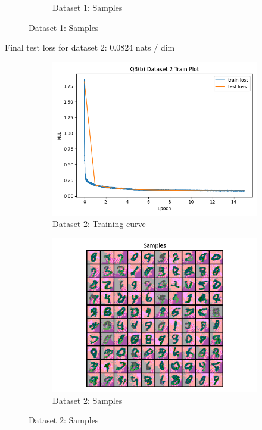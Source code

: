 \documentclass{article}
\begin{document}
\begin{enumerate}[(a)]
\begin{figure}[H]
\begin{subfigure}{0.45\textwidth}
        \caption{Dataset 1: Samples}
    \end{subfigure}
\end{figure}
Final test loss for dataset 2: 0.0824 nats / dim
\begin{figure}[H]
    \centering
    \begin{subfigure}{0.45\textwidth}
        \centering
        \includegraphics[width=\textwidth]{figures/q3_b_dset2_train_plot.png}
        \caption{Dataset 2: Training curve}
    \end{subfigure}
    \hspace{0.2in}
    \begin{subfigure}{0.45\textwidth}
        \centering
        \includegraphics[width=\textwidth]{figures/q3_b_dset2_samples.png}
        \caption{Dataset 2: Samples}
    \end{subfigure}
\end{figure}


\end{enumerate}
\end{document}
